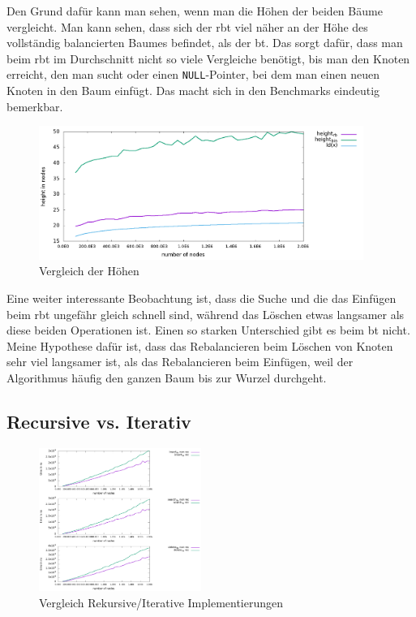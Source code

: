 \documentclass[11pt]{article}
\newcommand{\lstin}[1]{\lstinline[language=C]{#1}}
\begin{document}
Den Grund dafür kann man sehen, wenn man die Höhen der beiden Bäume vergleicht. Man kann sehen, dass sich der \gls{rbt} viel näher an der Höhe des vollständig balancierten Baumes befindet, 
als der \gls{bt}. Das sorgt dafür, dass man beim \gls{rbt} im Durchschnitt nicht so viele Vergleiche benötigt, bis man den Knoten erreicht, den man sucht oder einen \lstin{NULL}-Pointer, bei dem 
man einen neuen Knoten in den Baum einfügt. Das macht sich in den Benchmarks eindeutig bemerkbar.  

\begin{figure}
  \centering
  \includegraphics[width=400px]{../benchmark/compare_height.png}
  \caption{Vergleich der Höhen}
\end{figure}

Eine weiter interessante Beobachtung ist, dass die Suche und die das Einfügen beim \gls{rbt} ungefähr gleich schnell sind, während das Löschen etwas langsamer als diese beiden Operationen ist.
Einen so starken Unterschied gibt es beim \gls{bt} nicht. Meine Hypothese dafür ist, dass das Rebalancieren beim Löschen von Knoten sehr viel langsamer ist, als das Rebalancieren beim Einfügen, weil
der Algorithmus häufig den ganzen Baum bis zur Wurzel durchgeht. 

\subsection{Recursive vs. Iterativ} \label{ben2}

\begin{figure}
  \centering
  \includegraphics[width=200px]{../benchmark/compare_insert.png}
  \caption{Vergleich Rekursive/Iterative Implementierungen}
  \label{bir}
\end{figure}
\end{document}
